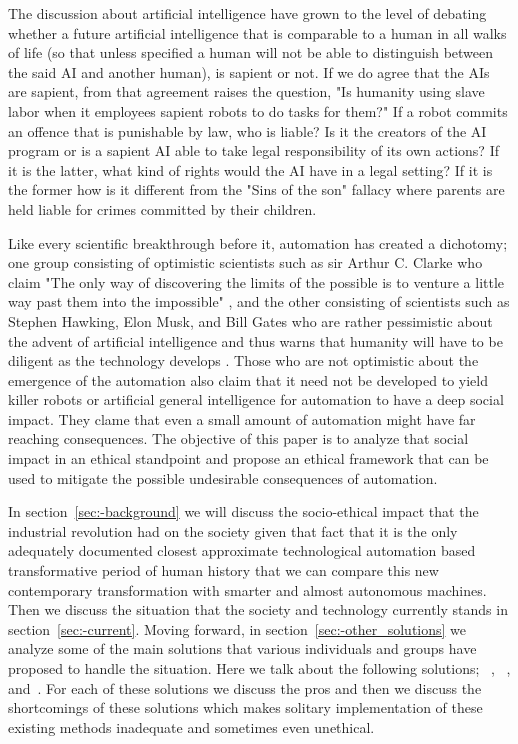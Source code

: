 The discussion about artificial intelligence have grown to the level of debating whether a future artificial intelligence that is comparable to a human in all walks of life (so that unless specified a human will not be able to distinguish between the said AI and another human\cite{eyal1999turing}), is sapient or not. If we do agree that the AIs are sapient, from that agreement raises the question, "Is humanity using slave labor when it employees sapient robots to do tasks for them?" If a robot commits an offence that is punishable by law, who is liable? Is it the creators of the AI program or is a sapient AI able to take legal responsibility of its own actions? If it is the latter, what kind of rights would the AI have in a legal setting? If it is the former how is it different from the "Sins of the son" fallacy where parents are held liable for crimes committed by their children.  

Like every scientific breakthrough before it, automation has created a dichotomy; one group consisting of optimistic scientists such as sir Arthur C. Clarke who claim "The only way of discovering the limits of the possible is to venture a little way past them into the impossible" \cite{arthur1962limits}, and the other consisting of scientists such as Stephen Hawking, Elon Musk, and Bill Gates who are rather pessimistic about the advent of artificial intelligence and thus warns that humanity will have to be diligent as the technology develops \cite{michael2016warning}. Those who are not optimistic about the emergence of the automation also claim that it need not be developed to yield killer robots or artificial general intelligence \cite{luke2013agi} for automation to have a deep social impact. They clame that even a small amount of automation might have far reaching consequences.  The objective of this paper is to analyze that social impact in an ethical standpoint and propose an ethical framework that can be used to mitigate the possible undesirable consequences of automation.  

In section~\ref{sec:-background} we will discuss the socio-ethical impact that the industrial revolution had on the society given that fact that it is the only adequately documented closest approximate technological automation based transformative period of human history that we can compare this new contemporary transformation with smarter and almost autonomous machines. Then we discuss the situation that the society and technology currently stands in section~\ref{sec:-current}. Moving forward, in section~\ref{sec:-other_solutions}  we analyze some of the main solutions that various individuals and groups have proposed to handle the situation. Here we talk about the following solutions; 
~,
~, and~. For each of these solutions we discuss the pros and then we discuss the shortcomings of these solutions which makes solitary implementation of these existing methods inadequate and sometimes even unethical.


